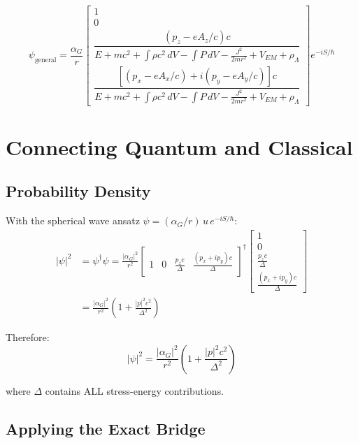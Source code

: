 \documentclass[11pt,a4paper]{article}
\theoremstyle{definition}
\theoremstyle{remark}
\begin{document}
	\begin{equation}
		\boxed{
			\psi_{\mathrm{general}} = \frac{\alpha_G}{r}\begin{bmatrix}
				1 \\ 0 \\
				\dfrac{(p_z-eA_z/c)c}{E+mc^2+\int\rho c^2\,dV-\int P\,dV-\frac{J^2}{2mr^2}+V_{EM}+\rho_\Lambda} \\[10pt]
				\dfrac{[(p_x-eA_x/c)+i(p_y-eA_y/c)]c}{E+mc^2+\int\rho c^2\,dV-\int P\,dV-\frac{J^2}{2mr^2}+V_{EM}+\rho_\Lambda}
			\end{bmatrix}e^{-iS/\hbar}
		}
	\end{equation}
	
	\section{Connecting Quantum and Classical}
	
	\subsection{Probability Density}
	
	With the spherical wave ansatz $\psi = (\alpha_G/r)\,u\,e^{-iS/\hbar}$:
	\begin{align}
		|\psi|^2 &= \psi^\dagger\psi
		= \frac{|\alpha_G|^2}{r^2}\begin{bmatrix}1&0&\frac{p_zc}{\Delta}&\frac{(p_x+ip_y)c}{\Delta}\end{bmatrix}^\dagger
		\begin{bmatrix}1\\0\\\frac{p_zc}{\Delta}\\\frac{(p_x+ip_y)c}{\Delta}\end{bmatrix} \\
		&= \frac{|\alpha_G|^2}{r^2}\!\left(1 + \frac{|p|^2 c^2}{\Delta^2}\right)
	\end{align}
	
	Therefore:
	\begin{equation}
		\boxed{|\psi|^2 = \frac{|\alpha_G|^2}{r^2}\!\left(1 + \frac{|p|^2 c^2}{\Delta^2}\right)}
		\label{eq:prob_density}
	\end{equation}
	
	where $\Delta$ contains ALL stress-energy contributions.
	
	\subsection{Applying the Exact Bridge}
	
\end{document}
